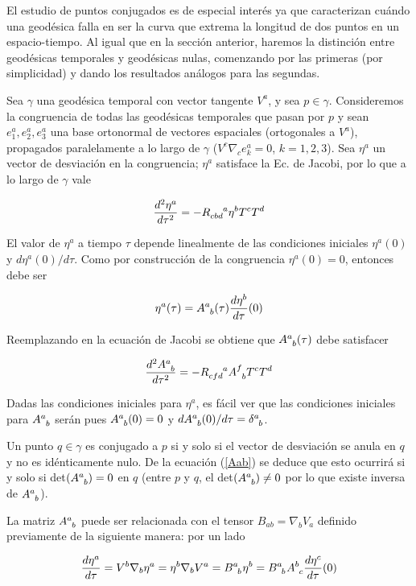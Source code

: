El estudio de puntos conjugados es de especial interés ya que caracterizan cuándo una geodésica falla en ser la curva que extrema la longitud de dos puntos en un espacio-tiempo. Al igual que en la sección anterior, haremos la distinción entre geodésicas temporales y geodésicas nulas, comenzando por las primeras (por simplicidad) y dando los resultados análogos para las segundas.

Sea $\gamma$ una geodésica temporal con vector tangente $V^a$, y sea $p\in \gamma$. Consideremos la congruencia de todas las geodésicas temporales que pasan por $p$ y sean $e^a_1, e^a_2, e^a_3$ una base ortonormal de vectores espaciales (ortogonales a $V^a$), propagados paralelamente a lo largo de $\gamma$ ($V^c\nabla_ce^a_k=0$, $k=1,2,3$). Sea $\eta^a$ un vector de desviación en la congruencia; $\eta^a$ satisface la Ec. de Jacobi, por lo que a lo largo de $\gamma$ vale 

$$
\frac{d^2\eta^a}{d\tau^2}=-\tensor{R}{_{cbd}^a}\eta^bT^cT^d
$$

El valor de $\eta^a$ a tiempo $\tau$ depende linealmente de las condiciones iniciales $\eta^a(0)$ y $d\eta^a(0)/d\tau$. Como por construcción de la congruencia $\eta^a(0)=0$, entonces debe ser 


\begin{equation}\label{Aab}
\eta^a(\tau)=\tensor{A}{^a_b}(\tau)\frac{d\eta^b}{d\tau}(0)
\end{equation}


Reemplazando en la ecuación de Jacobi se obtiene que $\tensor{A}{^a_b}(\tau)$ debe satisfacer

$$
\frac{d^2\tensor{A}{^a_b}}{d\tau^2}=-\tensor{R}{_{cfd}^a}\tensor{A}{^f_b}T^cT^d
$$

Dadas las condiciones iniciales para $\eta^a$, es fácil ver que las condiciones iniciales para $\tensor{A}{^a_b}$ serán pues $\tensor{A}{^a_b}(0)=0$ y $d\tensor{A}{^a_b}(0)/d\tau=\tensor{\delta}{^a_b}$.

Un punto $q\in \gamma$ es conjugado a $p$ si y solo si el vector de desviación se anula en $q$ y no es idénticamente nulo. De la ecuación (\ref{Aab}) se deduce que esto ocurrirá si y solo si det$(\tensor{A}{^a_b})=0$ en $q$ (entre $p$ y $q$, el det$(\tensor{A}{^a_b})\neq0$ por lo que existe inversa de $\tensor{A}{^a_b}$).

La matriz $\tensor{A}{^a_b}$ puede ser relacionada con el tensor $B_{ab}=\nabla_bV_a$ definido previamente de la siguiente manera: por un lado 


$$
\frac{d\eta^a}{d\tau}=V^b\nabla_b\eta^a=\eta^b\nabla_bV^a=\tensor{B}{^a_b}\eta^b=\tensor{B}{^a_b}\tensor{A}{^b_c}\frac{d\eta^c}{d\tau}(0)
$$

